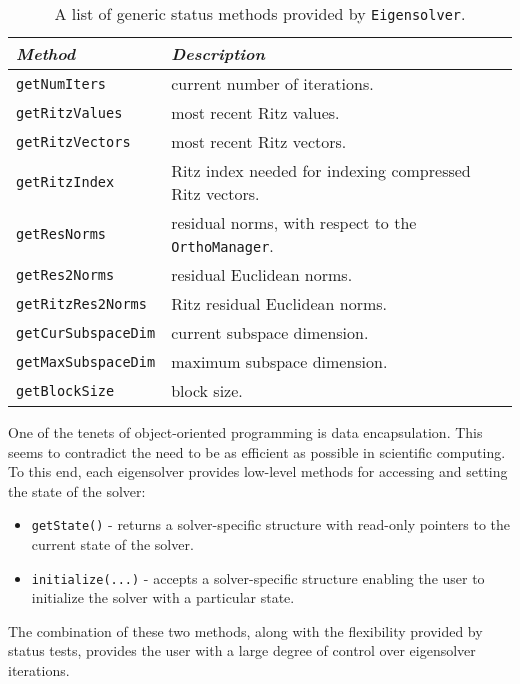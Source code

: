 \documentclass[acmtoms]{acmtrans2m}
\newcommand{\aspace}[1]{\texttt{#1}}
\begin{document}
\begin{table}[htp]
\begin{center}
\caption{A list of generic status methods provided by
\aspace{Eigensolver}.} \label{tab:anasazi:genstatusmethods}
\begin{tabular}{| p{3cm} | p{6cm} |}
\hline
\emph{Method} & \emph{Description} \\
\hline
{\tt getNumIters}       & current number of iterations. \\
{\tt getRitzValues}     & most recent Ritz values. \\
{\tt getRitzVectors}    & most recent Ritz vectors. \\
{\tt getRitzIndex}      & Ritz index needed for indexing compressed Ritz vectors. \\
{\tt getResNorms}       & residual norms, with respect to the \aspace{OrthoManager}. \\
{\tt getRes2Norms}      & residual Euclidean norms. \\
{\tt getRitzRes2Norms}  & Ritz residual  Euclidean norms. \\
{\tt getCurSubspaceDim} & current subspace dimension. \\
{\tt getMaxSubspaceDim} & maximum subspace dimension. \\
{\tt getBlockSize}      & block size. \\
\hline
\end{tabular}
\end{center}
\end{table}

One of the tenets of object-oriented programming is data
encapsulation. This seems to contradict the need to be as efficient
as possible in scientific computing. To this end, each eigensolver
provides low-level methods for accessing and setting the state of
the solver:
\begin{itemize}
  \item \verb!getState()! - returns a solver-specific structure with read-only pointers to
    the current state of the solver.
  \item \verb!initialize(...)! - accepts a solver-specific structure enabling the user to
    initialize the solver with a particular state.
\end{itemize}
The combination of these two methods, along with the flexibility
provided by status tests, provides the user with a large degree of
control over eigensolver iterations.

\end{document}
